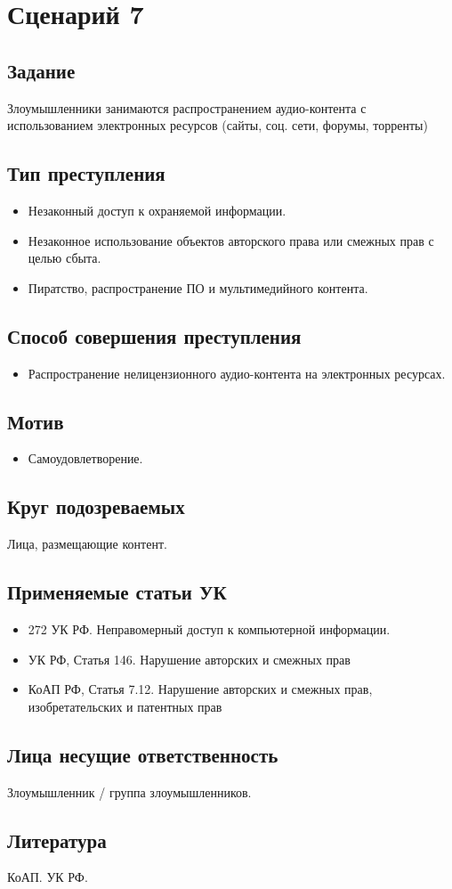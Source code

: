 \section*{Сценарий 7}

\subsection*{Задание}
Злоумышленники занимаются распространением аудио-контента с использованием
электронных ресурсов (сайты, соц. сети, форумы, торренты)

\subsection*{Тип преступления}
\begin{itemize}
  \item Незаконный доступ к охраняемой информации.
  \item Незаконное использование объектов авторского права или смежных прав с
    целью сбыта.
  \item Пиратство, распространение ПО и мультимедийного контента.
\end{itemize}

\subsection*{Способ совершения преступления}
\begin{itemize}
  \item Распространение нелицензионного аудио-контента на электронных ресурсах.
\end{itemize}

\subsection*{Мотив}
\begin{itemize}
  \item Самоудовлетворение.
\end{itemize}

\subsection*{Круг подозреваемых}
Лица, размещающие контент. 

\subsection*{Применяемые статьи УК}
\begin{itemize}
  \item 272 УК РФ. Неправомерный доступ к компьютерной информации.
  \item УК РФ, Статья 146. Нарушение авторских и смежных прав
  \item КоАП РФ, Статья 7.12. Нарушение авторских и смежных прав,
    изобретательских и патентных прав
\end{itemize}

\subsection*{Лица несущие ответственность}
Злоумышленник / группа злоумышленников.

\subsection*{Литература} КоАП. УК РФ.
